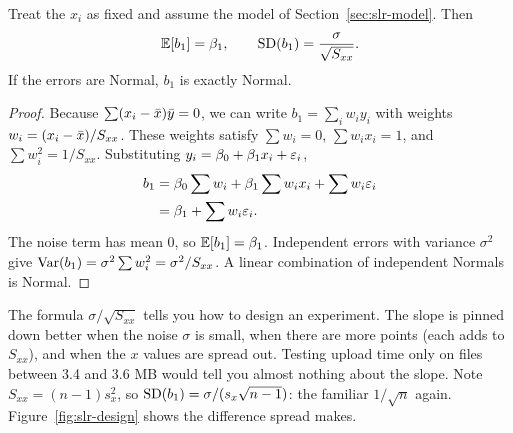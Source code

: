 \begin{theorem}
\label{thm:slr-b1}
Treat the $x_i$ as fixed and assume the model of Section~\ref{sec:slr-model}.
Then
\[
  \operatorname{\mathbb{E}}[b_1] = \beta_1, \qquad \operatorname{SD}(b_1) = \frac{\sigma}{\sqrt{S_{xx}}} .
\]
If the errors are Normal, $b_1$ is exactly Normal.
\end{theorem}

\begin{proof}
Because $\sum(x_i-\bar{x})\bar{y} = 0$, we can write
$b_1 = \sum_{i} w_i y_i$ with weights $w_i = (x_i-\bar{x})/S_{xx}$. These weights
satisfy $\sum w_i = 0$, $\sum w_i x_i = 1$, and $\sum w_i^2 = 1/S_{xx}$.
Substituting $y_i = \beta_0+\beta_1x_i+\varepsilon_i$,
\begin{align*}
  b_1 &= \beta_0\sum w_i + \beta_1 \sum w_i x_i + \sum w_i\varepsilon_i \\
      &= \beta_1 + \sum w_i \varepsilon_i .
\end{align*}
The noise term has mean $0$, so $\operatorname{\mathbb{E}}[b_1]=\beta_1$. Independent errors with
variance $\sigma^2$ give $\operatorname{Var}(b_1) = \sigma^2\sum w_i^2 = \sigma^2/S_{xx}$. A
linear combination of independent Normals is Normal.
\end{proof}

The formula $\sigma/\sqrt{S_{xx}}$ tells you how to design an experiment.
The slope is pinned down better when the noise $\sigma$ is small, when there
are more points (each adds to $S_{xx}$), and when the $x$ values are spread out.
Testing upload time only on files between 3.4 and 3.6 MB would tell you almost
nothing about the slope. Note $S_{xx} = (n-1)s_x^2$, so
$\operatorname{SD}(b_1) = \sigma/(s_x\sqrt{n-1})$: the familiar $1/\sqrt n$ again.
Figure~\ref{fig:slr-design} shows the difference spread makes.

